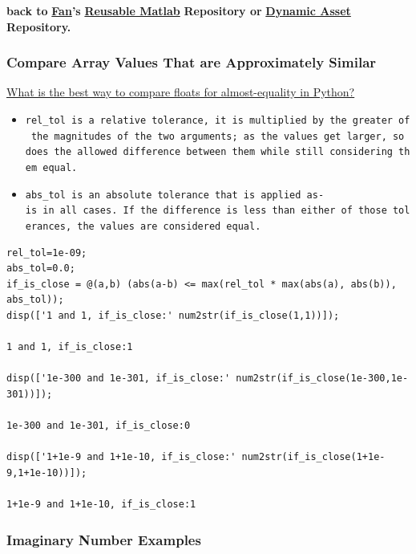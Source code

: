 \documentclass[
]{book}
\begin{document}
\textbf{back to} \href{https://fanwangecon.github.io}{\textbf{Fan}}\textbf{'s} \href{https://fanwangecon.github.io/M4Econ/}{\textbf{Reusable
Matlab}} \textbf{Repository or}
\href{https://fanwangecon.github.io/CodeDynaAsset/}{\textbf{Dynamic Asset}}
\textbf{Repository.}

\hypertarget{compare-array-values-that-are-approximately-similar}{%
\subsubsection{Compare Array Values That are Approximately Similar}\label{compare-array-values-that-are-approximately-similar}}

\href{https://stackoverflow.com/a/33024979/8280804}{What is the best way to compare floats for almost-equality in
Python?}

\begin{itemize}
\item
  \texttt{rel\_tol\ is\ a\ relative\ tolerance,\ it\ is\ multiplied\ by\ the\ greater\ of\ the\ magnitudes\ of\ the\ two\ arguments;\ as\ the\ values\ get\ larger,\ so\ does\ the\ allowed\ difference\ between\ them\ while\ still\ considering\ them\ equal.}
\item
  \texttt{abs\_tol\ is\ an\ absolute\ tolerance\ that\ is\ applied\ as-is\ in\ all\ cases.\ If\ the\ difference\ is\ less\ than\ either\ of\ those\ tolerances,\ the\ values\ are\ considered\ equal.}
\end{itemize}

\begin{verbatim}
rel_tol=1e-09;
abs_tol=0.0;
if_is_close = @(a,b) (abs(a-b) <= max(rel_tol * max(abs(a), abs(b)), abs_tol));
disp(['1 and 1, if_is_close:' num2str(if_is_close(1,1))]);

1 and 1, if_is_close:1

disp(['1e-300 and 1e-301, if_is_close:' num2str(if_is_close(1e-300,1e-301))]);

1e-300 and 1e-301, if_is_close:0

disp(['1+1e-9 and 1+1e-10, if_is_close:' num2str(if_is_close(1+1e-9,1+1e-10))]);

1+1e-9 and 1+1e-10, if_is_close:1
\end{verbatim}

\hypertarget{imaginary-number-examples}{%
\subsubsection{Imaginary Number Examples}\label{imaginary-number-examples}}
\end{document}
